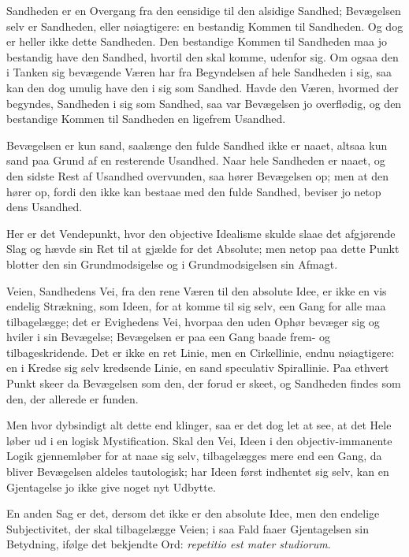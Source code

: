 \documentclass[12pt]{book}
\newcommand{\opage}[1]{\marginnote{\footnotesize\textit{[#1]}}}
\begin{document}
Sandheden er en Overgang fra den eensidige til den alsidige Sandhed;
Bevægelsen selv er Sandheden, eller nøiagtigere: en bestandig Kommen
til Sandheden. Og dog er heller ikke dette Sandheden. Den bestandige
Kommen til Sandheden maa jo bestandig have den Sandhed, hvortil den
skal komme, udenfor sig. Om ogsaa den i Tanken sig bevægende Væren
har fra Begyndelsen af hele Sandheden i sig, saa kan den dog umulig
have den i sig som Sandhed. Havde den Væren, hvormed der begyndes,
Sandheden i sig som Sandhed, saa var Bevægelsen jo overflødig, og
den bestandige Kommen til Sandheden en ligefrem Usandhed.

Bevægelsen er kun sand, saalænge den fulde Sandhed ikke er naaet,
altsaa kun sand paa Grund af en resterende Usandhed. Naar hele
Sandheden er naaet, og den sidste Rest af Usandhed overvunden, saa
hører Bevægelsen op; men at den hører op, fordi den ikke kan bestaae
med den fulde Sandhed, beviser jo netop dens Usandhed.

Her er det Vendepunkt, hvor den objective Idealisme skulde slaae det
afgjørende Slag og hævde sin Ret til at
\opage{66} gjælde for det Absolute; men netop paa dette Punkt blotter den sin
Grundmodsigelse og i Grundmodsigelsen sin Afmagt.

Veien, Sandhedens Vei, fra den rene Væren til den absolute Idee, er
ikke en vis endelig Strækning, som Ideen, for at komme til sig selv,
een Gang for alle maa tilbagelægge; det er Evighedens Vei, hvorpaa
den uden Ophør bevæger sig og hviler i sin Bevægelse; Bevægelsen er
paa een Gang baade frem- og tilbageskridende. Det er ikke en ret
Linie, men en Cirkellinie, endnu nøiagtigere: en i Kredse sig selv
kredsende Linie, en sand speculativ Spirallinie. Paa ethvert Punkt
skeer da Bevægelsen som den, der forud er skeet, og Sandheden findes
som den, der allerede er funden.

Men hvor dybsindigt alt dette end klinger, saa er det dog let at
see, at det Hele løber ud i en logisk Mystification. Skal den Vei,
Ideen i den objectiv-immanente Logik gjennemløber for at naae sig
selv, tilbagelægges mere end een Gang, da bliver Bevægelsen aldeles
tautologisk; har Ideen først indhentet sig selv, kan en Gjentagelse
jo ikke give noget nyt Udbytte.

En anden Sag er det, dersom det ikke er den absolute Idee, men den
endelige Subjectivitet, der skal tilbagelægge Veien; i saa Fald
faaer Gjentagelsen sin Betydning, ifølge det bekjendte Ord:
\textit{repetitio est mater studiorum}.
\end{document}
